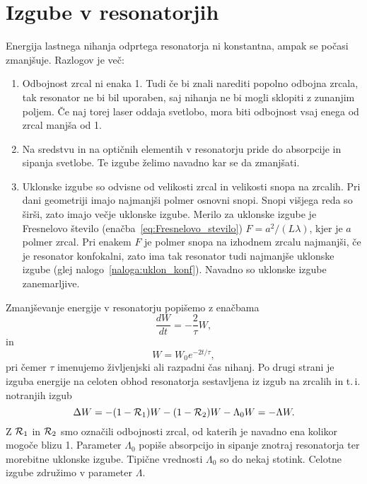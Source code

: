 \section{Izgube v resonatorjih}
Energija lastnega nihanja odprtega resonatorja ni konstantna, ampak se počasi
zmanjšuje. Razlogov je več:
\begin{enumerate}
\item Odbojnost zrcal ni enaka 1. Tudi če bi znali narediti popolno odbojna zrcala, 
tak resonator ne bi bil uporaben, saj nihanja ne bi mogli sklopiti z zunanjim poljem. Če 
naj torej laser oddaja svetlobo, mora biti odbojnost vsaj enega od zrcal manjša od 1.\\
\item Na sredstvu in na optičnih elementih v resonatorju pride do absorpcije in
sipanja svetlobe. Te izgube želimo navadno kar se da zmanjšati.\\
\item Uklonske izgube so odvisne od velikosti zrcal in velikosti snopa na zrcalih.
Pri dani geometriji imajo najmanjši polmer osnovni snopi. Snopi višjega
reda so širši, zato imajo večje uklonske izgube. Merilo za uklonske
izgube je Fresnelovo število (enačba~\ref{eq:Fresnelovo_stevilo}) 
$F=a^{2}/(L\lambda)$, kjer je $a$ polmer zrcal. Pri enakem $F$ je
polmer snopa na izhodnem zrcalu najmanjši, če je resonator konfokalni, 
zato ima tak resonator tudi najmanjše uklonske izgube (glej nalogo~\ref{naloga:uklon_konf}).
Navadno so uklonske izgube zanemarljive. 
\end{enumerate}

Zmanjševanje energije v resonatorju popišemo z enačbama 
\begin{equation}
\frac{dW}{dt}=-\frac{2}{\tau}W,
\label{eq:dW}
\end{equation}
in 
\begin{equation}
W = W_0 e^{-2t/\tau},
\label{eq:dW1}
\end{equation}
pri čemer $\tau$ imenujemo življenjski ali razpadni čas nihanj.
Po drugi strani je izguba energije na celoten obhod resonatorja 
sestavljena iz izgub na zrcalih in t.\,i.\, notranjih izgub
\begin{equation}
\Delta W = -(1-{\cal R}_{1})W-(1-{\cal R}_{2})W -\Lambda_{0} W = -\Lambda W.
\label{eq:Lambda}
\end{equation}
Z ${\cal R}_{1}$ in ${\cal R}_{2}$ smo označili odbojnosti zrcal, od katerih je navadno ena
kolikor mogoče blizu 1. Parameter $\Lambda_{0}$ popiše absorpcijo in
sipanje znotraj resonatorja ter morebitne uklonske izgube. Tipične vrednosti 
$\Lambda_0$ so do nekaj stotink. Celotne izgube združimo v parameter $\Lambda$. 


